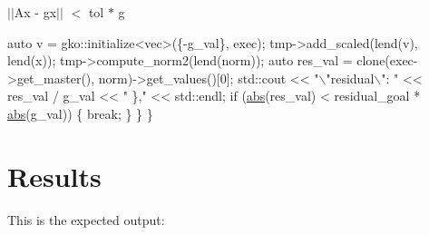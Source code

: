 $\vert$$\vert$\+Ax -\/ gx$\vert$$\vert$ $<$ tol $\ast$ g


\begin{DoxyCode}
        \textcolor{keyword}{auto} v = gko::initialize<vec>(\{-g\_val\}, exec);
        tmp->add\_scaled(lend(v), lend(x));
        tmp->compute\_norm2(lend(norm));
        \textcolor{keyword}{auto} res\_val = clone(exec->get\_master(), norm)->get\_values()[0];
        std::cout << \textcolor{stringliteral}{"\(\backslash\)"residual\(\backslash\)": "} << res\_val / g\_val << \textcolor{stringliteral}{" \},"} << std::endl;
        \textcolor{keywordflow}{if} (\hyperlink{namespacegko_a57797fc0a00fd4b7ff34ca4bfc84bc51}{abs}(res\_val) < residual\_goal * \hyperlink{namespacegko_a57797fc0a00fd4b7ff34ca4bfc84bc51}{abs}(g\_val)) \{
            \textcolor{keywordflow}{break};
        \}
    \}
\}
\end{DoxyCode}
 \label{_Results}%
\section*{Results}

This is the expected output\+:


